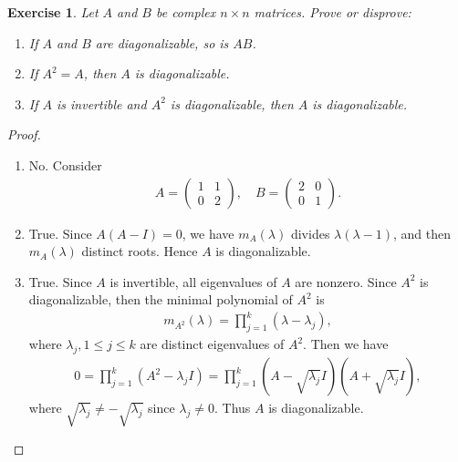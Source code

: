 \documentclass[11pt]{book}
\newtheorem{exercise}{Exercise}[section]
\theoremstyle{definition}
\numberwithin{equation}{chapter}
\begin{document}
\begin{exercise}
Let $A$ and $B$ be complex $n \times n$ matrices. Prove or disprove:
\begin{enumerate}[label=(\alph*)]
    \item If $A$ and $B$ are diagonalizable, so is $AB$.
    
    \item If $A^2 = A$, then $A$ is diagonalizable.
    
    \item If $A$ is invertible and $A^2$ is diagonalizable, then $A$ is diagonalizable.
\end{enumerate}
\end{exercise}
\begin{proof}
~\begin{enumerate}[label=(\alph*)]
    \item No. Consider
    \begin{align*}
        A = \begin{pmatrix}
            1 & 1 \\ 0 & 2
        \end{pmatrix}, \quad 
        B = \begin{pmatrix}
            2 & 0 \\ 0 & 1
        \end{pmatrix}.
    \end{align*}
    
    \item True. Since $A(A - I) = 0$, we have $m_A(\lambda)$ divides $\lambda(\lambda - 1)$, and then $m_A(\lambda)$ distinct roots. Hence $A$ is diagonalizable.
    
    \item True. Since $A$ is invertible, all eigenvalues of $A$ are nonzero. Since $A^2$ is diagonalizable, then the minimal polynomial of $A^2$ is 
    \begin{align*}
        m_{A^2}(\lambda) = \prod^k_{j=1} \left(\lambda - \lambda_j\right),
    \end{align*}
    where $\lambda_j, 1 \leq j \leq k$ are distinct eigenvalues of $A^2$. Then we have 
    \begin{align*}
        0 = \prod^k_{j=1} \left(A^2 - \lambda_j I\right) = \prod^k_{j=1} \left(A - \sqrt{\lambda_j} I\right)  \left(A + \sqrt{\lambda_j} I\right),
    \end{align*}
    where $\sqrt{\lambda_j} \neq - \sqrt{\lambda_j}$ since $\lambda_j \neq 0$. Thus $A$ is diagonalizable.
\end{enumerate}
\end{proof}
\end{document}

